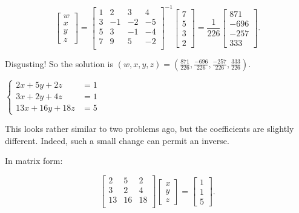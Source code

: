 \documentclass[../key.tex]{subfiles}
\begin{document}
$$\begin{bmatrix} w \\ x \\ y \\ z \end{bmatrix} = \begin{bmatrix}
1 & 2 & 3 & 4 \\
3 & -1 & -2 & -5 \\
5 & 3 & -1 & -4 \\
7 & 9 & 5 & -2 \\
\end{bmatrix}^{-1}\begin{bmatrix}
  7 \\ 5 \\ 3 \\ 2
\end{bmatrix} = \frac{1}{226} \begin{bmatrix} 871 \\ -696 \\ -257 \\ 333 \end{bmatrix}.$$

Disgusting! So the solution is $(w,x,y,z)=\left(\frac{871}{226},\frac{-696}{226},\frac{-257}{226},\frac{333}{226}\right)$.

\begin{inner_problem}
\item $\begin{cases} 2x+5y+2z &= 1 \\ 3x+2y+4z &= 1 \\ 13x+16y+18z &= 5 \end{cases}$
\end{inner_problem}

This looks rather similar to two problems ago, but the coefficients are slightly different. Indeed, such a small change can permit an inverse.

In matrix form:

$$\begin{bmatrix}
2 & 5 & 2 \\
3 & 2 & 4 \\
13 & 16 & 18 \\
\end{bmatrix}\begin{bmatrix}
x \\ y \\ z \end{bmatrix}
= \begin{bmatrix} 1 \\ 1 \\ 5 \end{bmatrix}.$$
\end{document}
